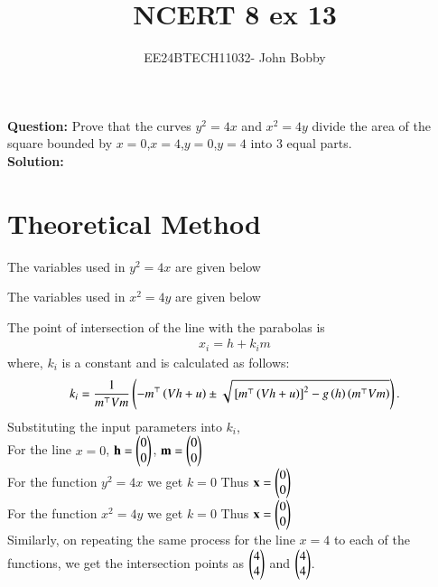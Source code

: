 \documentclass[journal,12pt,onecolumn]{IEEEtran}
\theoremstyle{remark}
\begin{document}

\vspace{3cm}

\title{\textbf{NCERT 8 ex 13}}
\author{EE24BTECH11032- John Bobby}
\maketitle
\bigskip
\textbf{Question:} Prove that the curves $y^2=4x$ and $x^2=4y$ divide the area of the square bounded by $x=0$,$x=4$,$y=0$,$y=4$ into $3$ equal parts.\\
\textbf{Solution:}\\
\section{Theoretical Method}
The variables used in $y^2=4x$ are given below
\begin{table}[H]
    \centering
    
\end{table} 
The variables used in $x^2=4y$ are given below
\begin{table}[H]
    \centering
    
\end{table} 
The point of intersection of the line with the parabolas is 
\begin{align}
    x_i = h + k_i m
\end{align}
where, $k_i$ is a constant and is calculated as follows:\\
\begin{align}
k_i = \frac{1}{m^\top Vm} \left(-m^\top \left(Vh + u\right) \pm \sqrt{{}\left[m^\top \left(Vh + u\right)\right]^2 - g\left(h\right)\left(m^\top Vm\right)}\right).
\end{align}
Substituting the input parameters into $k_i$,\\
For the line $x=0$, $\mathbf{h}=\begin{pmatrix}0 \\ 0\end{pmatrix}$, $\mathbf{m}=\begin{pmatrix}0 \\ 0\end{pmatrix}$\\
For the function $y^2=4x$ we get $k=0$ Thus
$\mathbf{x}=\begin{pmatrix}0 \\0\end{pmatrix}$\\
For the function $x^2=4y$ we get $k=0$ Thus
$\mathbf{x}=\begin{pmatrix}0 \\0\end{pmatrix}$\\
Similarly, on repeating the same process for the line $x=4$ to each of the functions, we get the intersection points as $\begin{pmatrix}4\\4\end{pmatrix}$ and $\begin{pmatrix}4 \\4\end{pmatrix}$.\\
\end{document}

